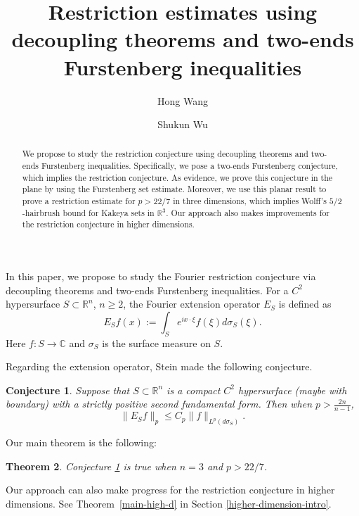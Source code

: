 \documentclass{amsart}
\author{Hong Wang}
\author{Shukun Wu}
\title[Restriction using decoupling and two-ends Furstenberg]{Restriction estimates using decoupling theorems and two-ends Furstenberg inequalities
}
\numberwithin{equation}{section}
\newtheorem{theorem}{Theorem}[section]
\newtheorem{conjecture}[theorem]{Conjecture}
\newcommand{\si}{\sigma}
\newcommand{\ZR}{\mathbb{R}}
\newcommand{\ZC}{\mathbb{C}}
\begin{document}
\begin{abstract}
We propose to study the restriction conjecture using decoupling theorems and two-ends Furstenberg inequalities. 
Specifically, we pose a two-ends Furstenberg conjecture, which implies the restriction conjecture.
As evidence, we prove this conjecture in the plane by using the Furstenberg set estimate.
Moreover, we use this planar result to prove a restriction estimate for $p>22/7$ in three dimensions, which implies Wolff's $5/2$-hairbrush bound for Kakeya sets in $\mathbb{R}^3$. 
Our approach also makes improvements for the restriction conjecture in higher dimensions.
\end{abstract}

\maketitle




In this paper, we propose to study the Fourier restriction conjecture via decoupling theorems and two-ends Furstenberg inequalities. For a $C^2$ hypersurface $S\subset\ZR^n$, $n\geq2$, the Fourier extension operator $E_S$ is defined as
\begin{equation}
    E_Sf(x):=\int_Se^{ix\cdot \xi}f(\xi)d\si_S(\xi).
\end{equation}
Here $f:S\to\ZC$ and $\si_S$ is the surface measure on $S$. 

Regarding the extension operator, Stein \cite{Stein-restriction} made the following conjecture.
\begin{conjecture}
\label{restriction-conj}
Suppose that $S\subset\ZR^n$ is a compact $C^2$ hypersurface (maybe with boundary) with a strictly positive second fundamental form. 
Then when $p>\frac{2n}{n-1}$,
\begin{equation}
\label{restriction-esti}
    \|E_Sf\|_p\leq C_p \|f\|_{L^p(d\si_S)}.
\end{equation}
\end{conjecture}
Our main theorem is the following:
\begin{theorem}
\label{main-3d}
Conjecture \ref{restriction-conj} is true when $n=3$ and $p>22/7$.
\end{theorem}
\noindent Our approach can also make progress for the restriction conjecture in higher dimensions. 
See Theorem~\ref{main-high-d} in Section \ref{higher-dimension-intro}.
\medskip
\end{document}

